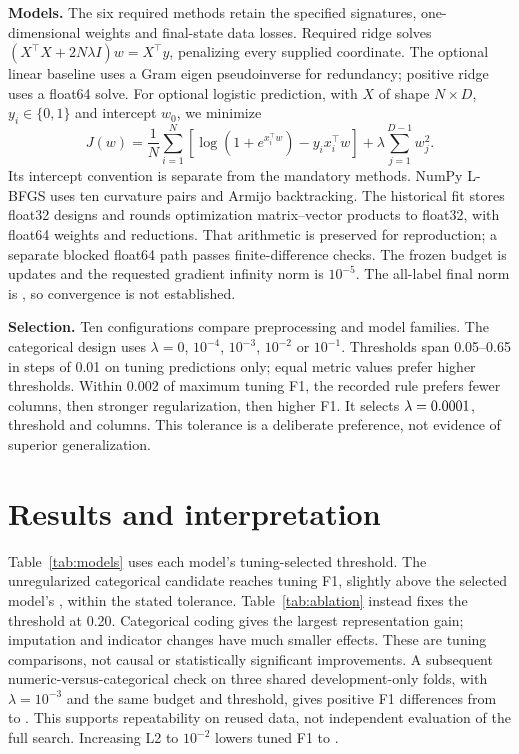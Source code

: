 \documentclass[10pt,conference,compsocconf]{IEEEtran}
\begin{document}
\textbf{Models.}
The six required methods retain the specified signatures, one-dimensional
weights and final-state data losses. Required ridge solves
$(X^\top X+2N\lambda I)w=X^\top y$, penalizing every supplied coordinate.
The optional linear baseline uses a Gram eigen pseudoinverse for redundancy;
positive ridge uses a float64 solve.
For optional logistic prediction, with $X$ of shape $N\times D$,
$y_i\in\{0,1\}$ and intercept $w_0$, we minimize
\begin{equation}
 J(w)=\frac{1}{N}\sum_{i=1}^N
 [\log(1+e^{x_i^\top w})-y_i x_i^\top w]
 +\lambda\sum_{j=1}^{D-1}w_j^2 .
\end{equation}
Its intercept convention is separate from the mandatory methods.
NumPy L-BFGS uses ten curvature pairs and Armijo backtracking.
The historical fit stores float32 designs and rounds optimization matrix--vector
products to float32, with float64 weights and reductions.
That arithmetic is preserved for reproduction; a separate blocked float64
path passes finite-difference checks.
The frozen budget is \MaxIterations{} updates and the requested gradient
infinity norm is $10^{-5}$. The all-label final norm is \FinalGradient{},
so convergence is not established.

\textbf{Selection.}
Ten configurations compare preprocessing and model families.
The categorical design uses $\lambda=0$, $10^{-4}$, $10^{-3}$,
$10^{-2}$ or $10^{-1}$.
Thresholds span 0.05--0.65 in steps of 0.01 on tuning predictions only;
equal metric values prefer higher thresholds.
Within 0.002 of maximum tuning F1, the recorded rule prefers fewer columns,
then stronger regularization, then higher F1. It selects
$\lambda=0.0001{}$, threshold \SelectedThreshold{} and
\SelectedDimension{} columns. This tolerance is a deliberate preference,
not evidence of superior generalization.

\section{Results and interpretation}
Table~\ref{tab:models} uses each model's tuning-selected threshold.
The unregularized categorical candidate reaches \UnregularizedFone{} tuning F1,
slightly above the selected model's \TuningFone{}, within the stated tolerance.
Table~\ref{tab:ablation} instead fixes the threshold at 0.20.
Categorical coding gives the largest representation gain; imputation and
indicator changes have much smaller effects. These are tuning comparisons,
not causal or statistically significant improvements.
A subsequent numeric-versus-categorical check on three shared development-only
folds, with $\lambda=10^{-3}$ and the same budget and threshold, gives positive
F1 differences from \CategoryRobustMin{} to \CategoryRobustMax{}.
This supports repeatability on reused data, not independent evaluation of
the full search. Increasing L2 to $10^{-2}$ lowers tuned F1 to \StrongLtwoFone{}.
\end{document}
